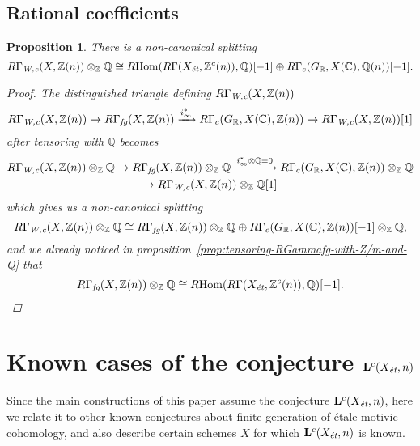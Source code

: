 \documentclass[leqno,12pt]{article}
\theoremstyle{plain}
\newtheorem{proposition}[theorem]{\indent\sc Proposition}
\theoremstyle{definition}
\DeclareMathOperator{\Hom}{Hom}
\newcommand{\CC}{\mathbb{C}}
\newcommand{\QQ}{\mathbb{Q}}
\newcommand{\RR}{\mathbb{R}}
\newcommand{\ZZ}{\mathbb{Z}}
\newcommand{\Wc}{\text{\it W,c}}
\newcommand{\et}{\text{\it \'{e}t}}
\newcommand{\fg}{\text{\it fg}}
\newcommand{\RHom}{R\!\Hom}
\begin{document}
\subsection*{Rational coefficients}

\begin{proposition}
  There is a non-canonical splitting
  \[ R\Gamma_\Wc (X, \ZZ(n)) \otimes_\ZZ \QQ \cong
    \RHom (R\Gamma (X_\et, \ZZ^c (n)), \QQ) [-1] \oplus
    R\Gamma_c (G_\RR, X (\CC), \QQ (n)) [-1]. \]

  \begin{proof}
    The distinguished triangle defining $R\Gamma_\Wc (X, \ZZ(n))$
    \[ R\Gamma_\Wc (X, \ZZ (n)) \to
      R\Gamma_\fg (X, \ZZ(n)) \xrightarrow{i_\infty^*}
      R\Gamma_c (G_\RR, X (\CC), \ZZ(n)) \to
      R\Gamma_\Wc (X, \ZZ (n)) [1] \]
    after tensoring with $\QQ$ becomes
    \begin{multline*}
      R\Gamma_\Wc (X, \ZZ (n))\otimes_\ZZ \QQ \to
      R\Gamma_\fg (X, \ZZ(n))\otimes_\ZZ \QQ \xrightarrow{i_\infty^*\otimes\QQ = 0}
      R\Gamma_c (G_\RR, X (\CC), \ZZ(n))\otimes_\ZZ \QQ \\
      \to R\Gamma_\Wc (X, \ZZ (n))\otimes_\ZZ \QQ [1]
    \end{multline*}
    which gives us a non-canonical splitting \cite[Chapitre~II,
    Corollaire~1.2.6]{Verdier-thesis}
    \[ R\Gamma_\Wc (X, \ZZ (n))\otimes_\ZZ \QQ \cong
      R\Gamma_\fg (X, \ZZ(n))\otimes_\ZZ \QQ \oplus
      R\Gamma_c (G_\RR, X (\CC), \ZZ(n)) [-1]\otimes_\ZZ \QQ, \]
    and we already noticed in
    proposition~\ref{prop:tensoring-RGammafg-with-Z/m-and-Q} that
    \[ R\Gamma_\fg (X, \ZZ (n)) \otimes_\ZZ \QQ \cong
      \RHom (R\Gamma (X_\et, \ZZ^c (n)), \QQ) [-1]. \qedhere \]
  \end{proof}
\end{proposition}


\section{Known cases of the conjecture $\mathbf{L}^c (X_\et,n)$}
\label{sec:known-cases-of-Lc-Xet-n}

Since the main constructions of this paper assume the conjecture
$\mathbf{L}^c (X_\et,n)$, here we relate it to other known conjectures about
finite generation of \'{e}tale motivic cohomology, and also describe certain schemes
$X$ for which $\mathbf{L}^c (X_\et,n)$ is known.
\end{document}
